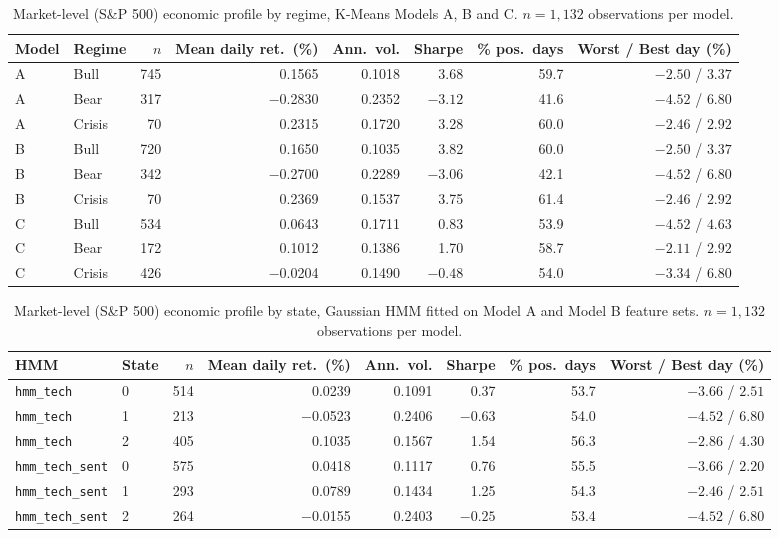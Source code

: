 \begin{table}[H]
\centering
\caption{Market-level (S\&P 500) economic profile by regime, K-Means Models A, B and C. $n=1{,}132$ observations per model.}
\label{tab:market-kmeans}
\small
\begin{tabular}{llrrrrrr}
\toprule
\textbf{Model} & \textbf{Regime} & \textbf{$n$} & \textbf{Mean daily ret.\ (\%)} & \textbf{Ann.\ vol.} & \textbf{Sharpe} & \textbf{\% pos.\ days} & \textbf{Worst / Best day (\%)} \\
\midrule
A & Bull    & 745 & 0.1565  & 0.1018 & 3.68  & 59.7 & $-2.50$ / $3.37$ \\
A & Bear    & 317 & $-$0.2830 & 0.2352 & $-3.12$ & 41.6 & $-4.52$ / $6.80$ \\
A & Crisis  & 70  & 0.2315  & 0.1720 & 3.28  & 60.0 & $-2.46$ / $2.92$ \\
\midrule
B & Bull    & 720 & 0.1650  & 0.1035 & 3.82  & 60.0 & $-2.50$ / $3.37$ \\
B & Bear    & 342 & $-$0.2700 & 0.2289 & $-3.06$ & 42.1 & $-4.52$ / $6.80$ \\
B & Crisis  & 70  & 0.2369  & 0.1537 & 3.75  & 61.4 & $-2.46$ / $2.92$ \\
\midrule
C & Bull    & 534 & 0.0643  & 0.1711 & 0.83  & 53.9 & $-4.52$ / $4.63$ \\
C & Bear    & 172 & 0.1012  & 0.1386 & 1.70  & 58.7 & $-2.11$ / $2.92$ \\
C & Crisis  & 426 & $-$0.0204 & 0.1490 & $-0.48$ & 54.0 & $-3.34$ / $6.80$ \\
\bottomrule
\end{tabular}
\end{table}

\begin{table}[H]
\centering
\caption{Market-level (S\&P 500) economic profile by state, Gaussian HMM fitted on Model A and Model B feature sets. $n=1{,}132$ observations per model.}
\label{tab:market-hmm}
\small
\begin{tabular}{llrrrrrr}
\toprule
\textbf{HMM} & \textbf{State} & \textbf{$n$} & \textbf{Mean daily ret.\ (\%)} & \textbf{Ann.\ vol.} & \textbf{Sharpe} & \textbf{\% pos.\ days} & \textbf{Worst / Best day (\%)} \\
\midrule
\texttt{hmm\_tech}      & 0 & 514 & 0.0239  & 0.1091 & 0.37  & 53.7 & $-3.66$ / $2.51$ \\
\texttt{hmm\_tech}      & 1 & 213 & $-$0.0523 & 0.2406 & $-0.63$ & 54.0 & $-4.52$ / $6.80$ \\
\texttt{hmm\_tech}      & 2 & 405 & 0.1035  & 0.1567 & 1.54  & 56.3 & $-2.86$ / $4.30$ \\
\midrule
\texttt{hmm\_tech\_sent} & 0 & 575 & 0.0418  & 0.1117 & 0.76  & 55.5 & $-3.66$ / $2.20$ \\
\texttt{hmm\_tech\_sent} & 1 & 293 & 0.0789  & 0.1434 & 1.25  & 54.3 & $-2.46$ / $2.51$ \\
\texttt{hmm\_tech\_sent} & 2 & 264 & $-$0.0155 & 0.2403 & $-0.25$ & 53.4 & $-4.52$ / $6.80$ \\
\bottomrule
\end{tabular}
\end{table}

